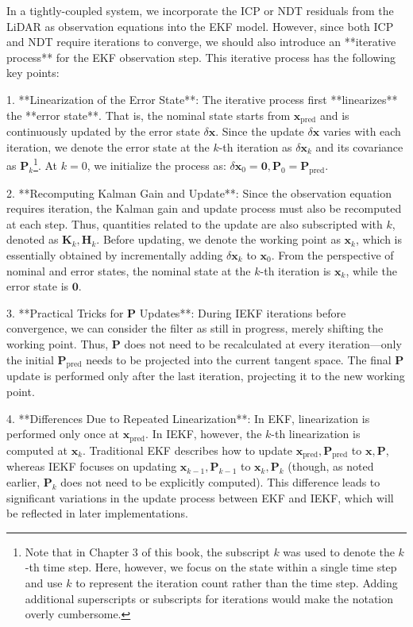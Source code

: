 In a tightly-coupled system, we incorporate the ICP or NDT residuals from the LiDAR as observation equations into the EKF model. However, since both ICP and NDT require iterations to converge, we should also introduce an **iterative process** for the EKF observation step. This iterative process has the following key points:  

1. **Linearization of the Error State**: The iterative process first **linearizes** the **error state**. That is, the nominal state starts from \(\mathbf{x}_{\mathrm{pred}}\) and is continuously updated by the error state \(\delta \mathbf{x}\). Since the update \(\delta \mathbf{x}\) varies with each iteration, we denote the error state at the \(k\)-th iteration as \(\delta \mathbf{x}_k\) and its covariance as \(\mathbf{P}_k\)\footnote{Note that in Chapter 3 of this book, the subscript \(k\) was used to denote the \(k\)-th time step. Here, however, we focus on the state within a single time step and use \(k\) to represent the iteration count rather than the time step. Adding additional superscripts or subscripts for iterations would make the notation overly cumbersome.}. At \(k=0\), we initialize the process as: \(\delta \mathbf{x}_{0} = \mathbf{0}, \mathbf{P}_0 = \mathbf{P}_{\mathrm{pred}}\).  

2. **Recomputing Kalman Gain and Update**: Since the observation equation requires iteration, the Kalman gain and update process must also be recomputed at each step. Thus, quantities related to the update are also subscripted with \(k\), denoted as \(\mathbf{K}_k, \mathbf{H}_k\). Before updating, we denote the working point as \(\mathbf{x}_k\), which is essentially obtained by incrementally adding \(\delta \mathbf{x}_k\) to \(\mathbf{x}_0\). From the perspective of nominal and error states, the nominal state at the \(k\)-th iteration is \(\mathbf{x}_k\), while the error state is \(\mathbf{0}\).  

3. **Practical Tricks for \(\mathbf{P}\) Updates**: During IEKF iterations before convergence, we can consider the filter as still in progress, merely shifting the working point. Thus, \(\mathbf{P}\) does not need to be recalculated at every iteration—only the initial \(\mathbf{P}_{\mathrm{pred}}\) needs to be projected into the current tangent space. The final \(\mathbf{P}\) update is performed only after the last iteration, projecting it to the new working point.  

4. **Differences Due to Repeated Linearization**: In EKF, linearization is performed only once at \(\mathbf{x}_{\mathrm{pred}}\). In IEKF, however, the \(k\)-th linearization is computed at \(\mathbf{x}_k\). Traditional EKF describes how to update \(\mathbf{x}_{\mathrm{pred}}, \mathbf{P}_{\mathrm{pred}}\) to \(\mathbf{x}, \mathbf{P}\), whereas IEKF focuses on updating \(\mathbf{x}_{k-1}, \mathbf{P}_{k-1}\) to \(\mathbf{x}_{k}, \mathbf{P}_k\) (though, as noted earlier, \(\mathbf{P}_k\) does not need to be explicitly computed). This difference leads to significant variations in the update process between EKF and IEKF, which will be reflected in later implementations.  

